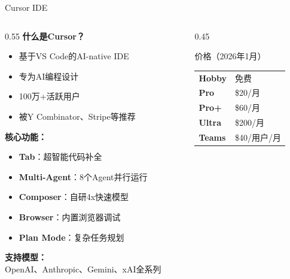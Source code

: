\documentclass[aspectratio=169,11pt]{beamer}
\begin{document}
\begin{frame}{Cursor IDE}
    \begin{columns}
        \begin{column}{0.55\textwidth}
            \textbf{什么是Cursor？}
            \begin{itemize}
                \item 基于VS Code的AI-native IDE
                \item 专为AI编程设计
                \item 100万+活跃用户
                \item 被Y Combinator、Stripe等推荐
            \end{itemize}
            
            \vspace{0.3cm}
            \textbf{核心功能：}
            \begin{itemize}
                \item \textbf{Tab}：超智能代码补全
                \item \textbf{Multi-Agent}：8个Agent并行运行
                \item \textbf{Composer}：自研4x快速模型
                \item \textbf{Browser}：内置浏览器调试
                \item \textbf{Plan Mode}：复杂任务规划
            \end{itemize}
            
            \vspace{0.3cm}
            \textbf{支持模型：}\\
            OpenAI、Anthropic、Gemini、xAI全系列
        \end{column}
        \begin{column}{0.45\textwidth}
            \begin{block}{价格（2026年1月）}
                \begin{tabular}{ll}
                    \textbf{Hobby} & 免费 \\
                    \textbf{Pro} & \$20/月 \\
                    \textbf{Pro+} & \$60/月 \\
                    \textbf{Ultra} & \$200/月 \\
                    \textbf{Teams} & \$40/用户/月 \\
                \end{tabular}
            \end{block}
            

\end{column}
\end{columns}
\end{frame}
\end{document}
